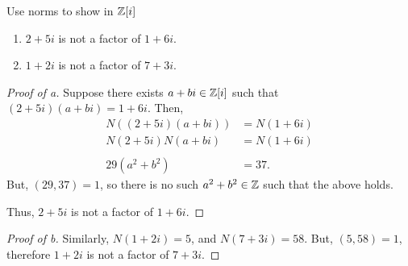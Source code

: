 \documentclass[../hw8]{subfiles}
\begin{document}
\begin{problem}
Use norms to show in $\mathbb{Z}[i]$
\begin{enumerate}[label=\alph*)]
	\item $2+5i$ is not a factor of  $1+6i$.
	\item $1+2i$ is not a factor of  $7+3i$.
\end{enumerate}
\end{problem}
\begin{proof}[Proof of a]
	Suppose there exists $a+bi \in \mathbb{Z}[i]$  such that $(2+5i)(a+bi)=1+6i$.
	Then,
	\begin{align*}
		N((2+5i)(a+bi)) & =N(1+6i)  \\
		N(2+5i)N(a+bi)  & = N(1+6i) \\ \\
		29(a^2+b^2)     & =37
		.\end{align*}
	But, $(29,37)=1$, so there is no such  $a^2 + b^2\in \mathbb{Z}$ such that the above holds.

	Thus, $2+5i$ is not a factor of $1+6i$.
\end{proof}
\begin{proof}[Proof of b]
	Similarly, $N(1+2i)=5$, and  $N(7+3i)=58$.
	But, $(5,58)=1$, therefore  $1+2i$ is not a factor of  $7+3i$.
\end{proof}
\end{document}
